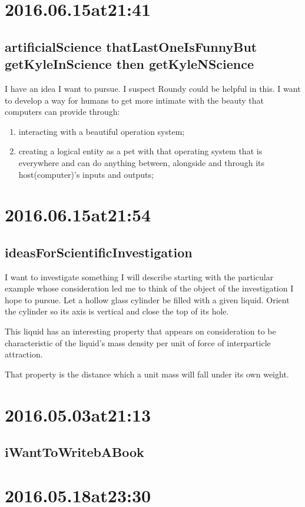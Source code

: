 \section*{ 2016.06.15at21:41 }
\subsection*{ artificialScience thatLastOneIsFunnyBut getKyleInScience then getKyleNScience }
I have an idea I want to pursue.
I suspect Roundy could be helpful in this.
I want to develop a way for humans to get more intimate with the beauty that computers can provide through:
\begin{enumerate}
\item interacting with a beautiful operation system;
\item creating a logical entity as a pet with that operating system that is everywhere and can do anything between, alongside and through its host(computer)'s inputs and outputs;
\end{enumerate}

\section*{ 2016.06.15at21:54 }
\subsection*{ ideasForScientificInvestigation }
I want to investigate something I will describe starting with the particular example whose consideration led me to think of the object of the investigation I hope to pursue.
Let a hollow glass cylinder be filled with a given liquid.
Orient the cylinder so its axis is vertical and close the top of its hole.

This liquid has an interesting property that appears on consideration to be characteristic of the liquid's mass density per unit of force of interparticle attraction.

That property is the distance which a unit mass will fall under its own weight.

\section*{2016.05.03at21:13}
\subsection*{iWantToWritebABook}

\section*{ 2016.05.18at23:30 }
